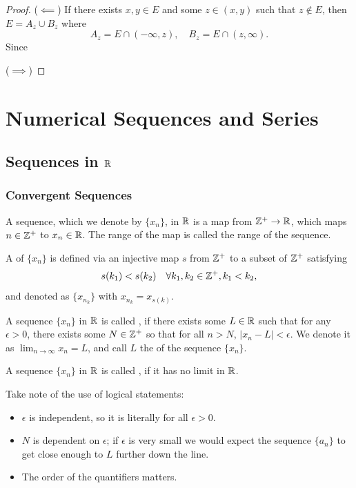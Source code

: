 \begin{proof}
($\impliedby$) If there exists $x,y\in E$ and some $z\in(x,y)$ such that $z\notin E$, then $E=A_z\cup B_z$ where
\[ A_z=E\cap(-\infty,z), \quad B_z=E\cap(z,\infty). \]
Since 

($\implies$) 
\end{proof}

\chapter{Numerical Sequences and Series}
\section{Sequences in $\mathbb R$}
\subsection{Convergent Sequences}
\begin{definition}
A sequence, which we denote by $\{x_n\}$, in $\mathbb R$ is a map from $\mathbb Z^+\to\mathbb R$, which maps $n\in\mathbb Z^+$ to $x_n\in\mathbb R$. The range of the map is called the range of the sequence.

A  of $\{x_n\}$ is defined via an injective map $s$ from $\mathbb Z^+$ to a subset of $\mathbb Z^+$ satisfying
\[ s(k_1)<s(k_2) \quad \forall k_1,k_2\in\mathbb Z^+,k_1<k_2, \]
and denoted as $\{x_{n_k}\}$ with $x_{n_k}=x_{s(k)}$.

A sequence $\{x_n\}$ in $\mathbb R$ is called , if there exists some $L\in\mathbb R$ such that for any $\epsilon>0$, there exists some $N\in\mathbb Z^+$ so that for all $n>N$, $|x_n-L|<\epsilon$. We denote it as $\lim_{n\to\infty}x_n=L$, and call $L$ the  of the sequence $\{x_n\}$.

A sequence $\{x_n\}$ in $\mathbb R$ is called , if it has no limit in $\mathbb R$.
\end{definition}

\begin{remark}
Take note of the use of logical statements:
\begin{itemize}
\item $\epsilon$ is independent, so it is literally for all $\epsilon>0$.
\item $N$ is dependent on $\epsilon$; if $\epsilon$ is very small we would expect the sequence $\{a_n\}$ to get close enough to $L$ further down the line.
\item The order of the quantifiers matters.
\end{itemize}
\end{remark}

